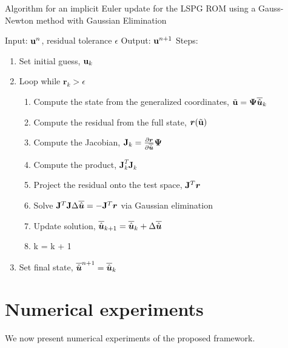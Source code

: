 \documentclass[3p,computermodern,10pt]{elsarticle}
\begin{document}
\begin{algorithm}[H]
\caption{Algorithm for an implicit Euler update for the LSPG ROM using a Gauss-Newton method with Gaussian Elimination}
\label{alg:alg_LSPG}
Input: $\mathbf{u}^n$, residual tolerance $\epsilon$ \;
Output: $\mathbf{u}^{n+1}$\;
Steps:
\begin{enumerate}
\item Set initial guess, $\mathbf{u}_k$
\item  Loop while $\mathbf{r}_k > \epsilon$
\begin{enumerate}
    \item Compute the state from the generalized coordinates, $\tilde{\mathbf{u}}  =\boldsymbol \Psi \overline{\hat{\boldsymbol u}}_{k}$
    \item Compute the residual from the full state, $\boldsymbol{r}(\tilde{\mathbf{u}})$
    \item Compute the Jacobian, $\mathbf{J}_k = \frac{\partial \boldsymbol{r}}{\partial \overline{\hat{\boldsymbol u}}} \boldsymbol \Psi $
    \item Compute the product, $\mathbf{J}_k^T \mathbf{J}_k$
    \item Project the residual onto the test space, $\mathbf{J}^T \boldsymbol{r}$
    \item Solve $\mathbf{J}^T \mathbf{J} \Delta \overline{\hat{\boldsymbol u}} = - \mathbf{J}^T \boldsymbol{r}$ via Gaussian elimination
    \item Update solution, $\overline{\hat{\boldsymbol u}}_{k+1} = \overline{\hat{\boldsymbol u}}_k + \Delta \overline{\hat{\boldsymbol u}}$
    \item k = k + 1
\end{enumerate}
\item Set final state, $\overline{\hat{\boldsymbol u}}^{n+1} = \overline{\hat{\boldsymbol u}}_k$
\end{enumerate}
\end{algorithm}




\section{Numerical experiments}
We now present numerical experiments of the proposed framework.
\end{document}
